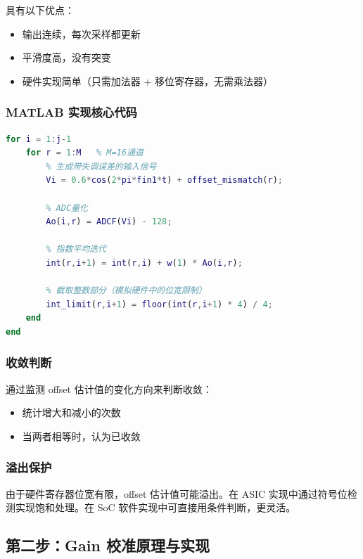 \documentclass[UTF8,a4paper,11pt]{ctexart}
\begin{document}
具有以下优点：
\begin{itemize}
    \item 输出连续，每次采样都更新
    \item 平滑度高，没有突变
    \item 硬件实现简单（只需加法器 + 移位寄存器，无需乘法器）
\end{itemize}

\subsubsection{MATLAB 实现核心代码}

\begin{lstlisting}[language=Matlab, caption={Offset校准核心迭代}]
for i = 1:j-1
    for r = 1:M   % M=16通道
        % 生成带失调误差的输入信号
        Vi = 0.6*cos(2*pi*fin1*t) + offset_mismatch(r);
        
        % ADC量化
        Ao(i,r) = ADCF(Vi) - 128;
        
        % 指数平均迭代
        int(r,i+1) = int(r,i) + w(1) * Ao(i,r);
        
        % 截取整数部分（模拟硬件中的位宽限制）
        int_limit(r,i+1) = floor(int(r,i+1) * 4) / 4;
    end
end
\end{lstlisting}

\subsubsection{收敛判断}

通过监测 offset 估计值的变化方向来判断收敛：
\begin{itemize}
    \item 统计增大和减小的次数
    \item 当两者相等时，认为已收敛
\end{itemize}

\subsubsection{溢出保护}

由于硬件寄存器位宽有限，offset 估计值可能溢出。在 ASIC 实现中通过符号位检测实现饱和处理。在 SoC 软件实现中可直接用条件判断，更灵活。

\subsection{第二步：Gain 校准原理与实现}
\label{sec:gain_cali}
\end{document}
